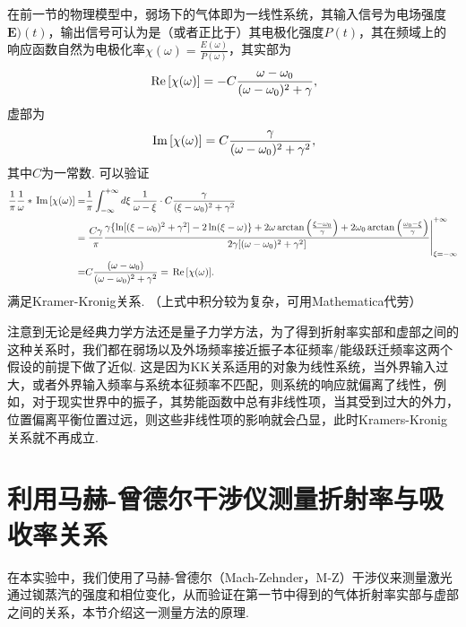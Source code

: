 \documentclass{assignment}
\begin{document}
在前一节的物理模型中，弱场下的气体即为一线性系统，其输入信号为电场强度$\bm{E})(t)$，输出信号可认为是（或者正比于）其电极化强度$P(t)$，其在频域上的响应函数自然为电极化率$\chi(\omega)=\frac{E(\omega)}{P(\omega)}$，其实部为
\begin{align}
    \,\text{Re}\,[\chi(\omega)]=-C\frac{\omega-\omega_0}{(\omega-\omega_0)^2+\gamma},
\end{align}
虚部为
\begin{align}
    \,\text{Im}\,[\chi(\omega)]=C\frac{\gamma}{(\omega-\omega_0)^2+\gamma^2},
\end{align}
其中$C$为一常数.
可以验证
\begin{align}
    \notag\frac{1}{\pi}\frac{1}{\omega}*\,\text{Im}\,[\chi(\omega)]=&\frac{1}{\pi}\int_{-\infty}^{+\infty}d\xi\,\frac{1}{\omega-\xi}\cdot C\frac{\gamma}{(\xi-\omega_0)^2+\gamma^2}\\
    \notag=&\left.\frac{C\gamma}{\pi}\frac{\gamma\{\ln[(\xi-\omega_0)^2+\gamma^2]-2\ln(\xi-\omega)\}+2\omega\arctan\left(\frac{\xi-\omega_0}{\gamma}\right)+2\omega_0\arctan\left(\frac{\omega_0-\xi}{\gamma}\right)}{2\gamma[(\omega-\omega_0)^2+\gamma^2]}\right\vert_{\xi=-\infty}^{+\infty}\\
    =&C\frac{(\omega-\omega_0)}{(\omega-\omega_0)^2+\gamma^2}=\,\text{Re}\,[\chi(\omega)].
\end{align}
满足Kramer-Kronig关系.
（上式中积分较为复杂，可用Mathematica代劳）

注意到无论是经典力学方法还是量子力学方法，为了得到折射率实部和虚部之间的这种关系时，我们都在弱场以及外场频率接近振子本征频率/能级跃迁频率这两个假设的前提下做了近似. 这是因为KK关系适用的对象为线性系统，当外界输入过大，或者外界输入频率与系统本征频率不匹配，则系统的响应就偏离了线性，例如，对于现实世界中的振子，其势能函数中总有非线性项，当其受到过大的外力，位置偏离平衡位置过远，则这些非线性项的影响就会凸显，此时Kramers-Kronig关系就不再成立.

\section{利用马赫-曾德尔干涉仪测量折射率与吸收率关系}
在本实验中，我们使用了马赫-曾德尔（Mach-Zehnder，M-Z）干涉仪来测量激光通过铷蒸汽的强度和相位变化，从而验证在第一节中得到的气体折射率实部与虚部之间的关系，本节介绍这一测量方法的原理.
\end{document}
